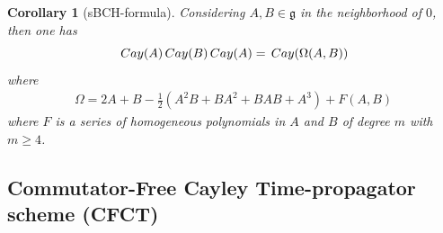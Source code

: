 \documentclass{article}
\newtheorem{corollary}{Corollary}[section]
\newcommand{\Cay}{\,{\rm Cay}}
\newcommand{\Om}{\Omega}
\begin{document}
{\begin{corollary}[sBCH-formula]
Considering $A, B \in \mathfrak g$ in the neighborhood of $0$, then one has
%
\begin{equation}
\label{eq:2-Cayley-composition}
\Cay(A) \Cay(B) \Cay(A) = \Cay(\Om(A,B)) 
\end{equation}
%
where 
%
\begin{equation}
\begin{aligned}
\Om =  2A + B - \frac{1}{2}(A^2B + BA^2 + BAB + A^3) + F(A,B)
\end{aligned}
\label{eq:composition_matrix_2}
\end{equation}
%
where $F$ is a series of homogeneous polynomials in $A$ and $B$ of degree $m$ with $m \ge 4$.
\end{corollary}


\subsection{Commutator-Free Cayley Time-propagator scheme (CFCT)} 

}
\end{document}

